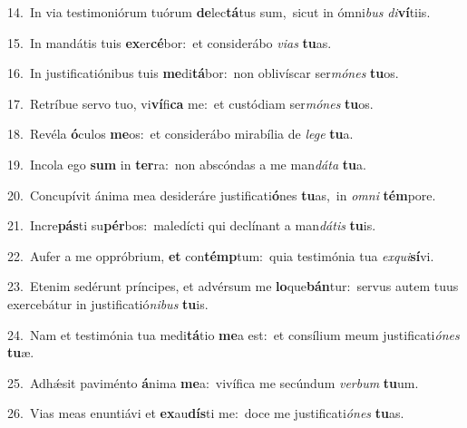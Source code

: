 {\numbfont\textcolor{\numbcolor}{14.}}~In via testimoniórum tuórum \textbf{de}\-lec\-\textbf{tá}\-tus sum,~\star sicut in ómni\textit{bus} \textit{di}\-\textbf{ví}tiis.\par
{\numbfont\textcolor{\numbcolor}{15.}}~In mandátis tuis \textbf{ex}\-er\-\textbf{cé}\-bor:~\star et considerábo \textit{vi}\-\textit{as} \textbf{tu}\-as.\par
{\numbfont\textcolor{\numbcolor}{16.}}~In justificatiónibus tuis \textbf{me}\-di\-\textbf{tá}\-bor:~\star non oblivíscar ser\-\textit{mó}\-\textit{nes} \textbf{tu}\-os.\par
{\numbfont\textcolor{\numbcolor}{17.}}~Retríbue servo tuo, vi\-\textbf{ví}\-fi\textbf{ca} me:~\star et custódiam ser\-\textit{mó}\-\textit{nes} \textbf{tu}\-os.\par
{\numbfont\textcolor{\numbcolor}{18.}}~Revéla \textbf{ó}\-culos \textbf{me}\-os:~\star et considerábo mirabília de \textit{le}\-\textit{ge} \textbf{tu}\-a.\par
{\numbfont\textcolor{\numbcolor}{19.}}~Incola ego \textbf{sum} in \textbf{ter}\-ra:~\star non abscóndas a me man\-\textit{dá}\-\textit{ta} \textbf{tu}\-a.\par
{\numbfont\textcolor{\numbcolor}{20.}}~Concupívit ánima mea desideráre justificati\-\textbf{ó}\-nes \textbf{tu}\-as,~\star in \textit{om}\-\textit{ni} \textbf{tém}\-pore.\par
{\numbfont\textcolor{\numbcolor}{21.}}~Incre\-\textbf{pás}\-ti su\-\textbf{pér}\-bos:~\star maledícti qui declínant a man\-\textit{dá}\-\textit{tis} \textbf{tu}\-is.\par
{\numbfont\textcolor{\numbcolor}{22.}}~Aufer a me oppróbrium, \textbf{et} con\-\textbf{témp}\-tum:~\star quia testimónia tua \textit{ex}\-\textit{qui}\textbf{sí}vi.\par
{\numbfont\textcolor{\numbcolor}{23.}}~Etenim sedérunt príncipes, et advérsum me \textbf{lo}\-que\-\textbf{bán}\-tur:~\star servus autem tuus exercebátur in justificatió\-\textit{ni}\-\textit{bus} \textbf{tu}\-is.\par
{\numbfont\textcolor{\numbcolor}{24.}}~Nam et testimónia tua medi\-\textbf{tá}\-tio \textbf{me}\-a est:~\star et consílium meum justificati\-\textit{ó}\-\textit{nes} \textbf{tu}\-æ.\par
{\numbfont\textcolor{\numbcolor}{25.}}~Adhǽsit paviménto \textbf{á}\-nima \textbf{me}\-a:~\star vivífica me secúndum \textit{ver}\-\textit{bum} \textbf{tu}\-um.\par
{\numbfont\textcolor{\numbcolor}{26.}}~Vias meas enuntiávi et \textbf{ex}\-au\-\textbf{dís}\-ti me:~\star doce me justificati\-\textit{ó}\-\textit{nes} \textbf{tu}\-as.\par
